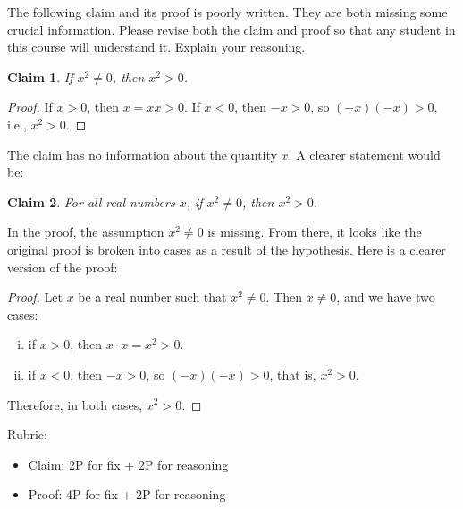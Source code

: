 \documentclass{article}
\newtheorem*{claim}{Claim}
\theoremstyle{definition}
\begin{document}
\begin{question}
   The following claim and its proof is poorly written. They are both missing some crucial information. 
   Please revise both the claim and proof so that any student in this course will understand it. Explain your reasoning.
      \begin{claim}
       If $x^2\neq 0$, then $x^2>0$.
      \end{claim}
      \begin{proof}
       If $x>0$, then $x=xx>0$. If $x<0$, then $-x>0$, so $(-x)(-x)>0$, i.e., $x^2>0$.
      \end{proof}
\end{question}
\begin{solution}
    The claim has no information about the quantity $x$. A clearer statement would be:
        \begin{claim}
           For all real numbers $x$, if $x^2\neq 0$, then $x^2>0$.
        \end{claim}
    In the proof, the assumption $x^2\neq 0$ is missing. 
    From there, it looks like the original proof is broken into cases as a result of the hypothesis. 
    Here is a clearer version of the proof:
        \begin{proof}
           Let $x$ be a real number such that $x^2\neq 0$. Then $x\neq 0$, and we have two cases:
            \begin{enumerate}[i.]
                 \item if $x>0$, then $x\cdot x=x^2>0$.
                 \item if $x<0$, then $-x>0$, so $(-x)(-x)>0$, that is, $x^2>0$.
            \end{enumerate}
           Therefore, in both cases, $x^2>0$.
        \end{proof}

{\color{red} Rubric:
\begin{itemize}
\item Claim: 2P for fix + 2P for reasoning
\item Proof: 4P for fix + 2P for reasoning
\end{itemize}}
\end{solution}
\end{document}
